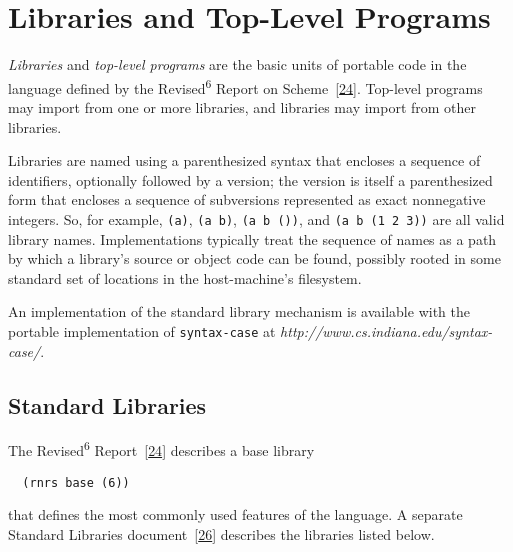 \chapter{Libraries and Top-Level Programs\label{libraries_CHPTLIBRARIES}}
\label{libraries_g142}
\label{libraries_h0}
\begin{figure}[H]
\centering
\setlength{\fboxrule}{3pt}
\end{figure}
\clearpage





\label{libraries_s0}\label{libraries_s1}\textit{Libraries} and
\textit{top-level programs} are the basic units of portable code in the
language defined by the Revised\textsuperscript{6} Report on Scheme [\hyperref[bibliography_g242]{24}].
Top-level programs may import from one or more libraries, and
libraries may import from other libraries.


Libraries are named using a parenthesized syntax that encloses a
sequence of identifiers, optionally followed by a version; the
version is itself a parenthesized form that encloses a sequence
of subversions represented as exact nonnegative integers.
So, for example, \texttt{(a)}, \texttt{(a b)}, \texttt{(a b ())},
and \texttt{(a b (1 2 3))} are all valid library names.
Implementations typically treat the sequence of names as a path by which a
library's source or object code can be found, possibly rooted in some
standard set of locations in the host-machine's filesystem.


An implementation of the standard library mechanism is available
with the portable implementation of \texttt{syntax-case}
at \textit{http://www.cs.indiana.edu/syntax-case/}.


\section{\label{libraries_g143}\label{libraries_h1}Standard Libraries}



The Revised\textsuperscript{6} Report [\hyperref[bibliography_g242]{24}] describes a base library


\texttt{  (rnrs base (6))}

that defines the most commonly used features of the language.
A separate Standard Libraries document [\hyperref[bibliography_g244]{26}] describes the
libraries listed below.



